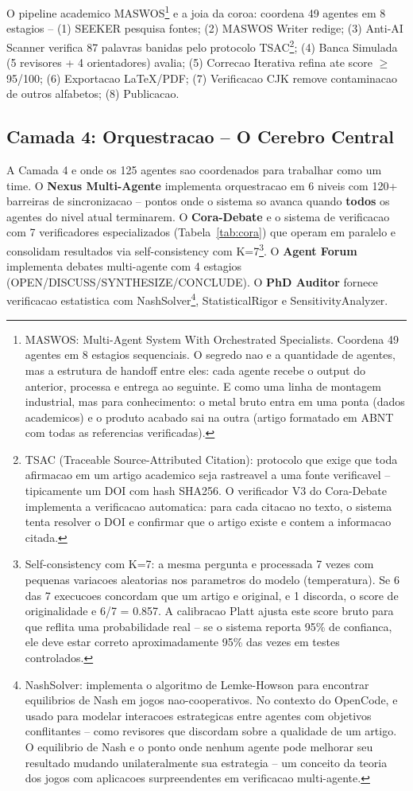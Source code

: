\documentclass[12pt,a4paper,oneside,sumario=tradicional,chapter=TITLE,section=TITLE,subsection=TITLE,english,brazil]{abntex2}
\begin{document}
O pipeline academico MASWOS\footnote{MASWOS: Multi-Agent System With Orchestrated Specialists. Coordena 49 agentes em 8 estagios sequenciais. O segredo nao e a quantidade de agentes, mas a estrutura de handoff entre eles: cada agente recebe o output do anterior, processa e entrega ao seguinte. E como uma linha de montagem industrial, mas para conhecimento: o metal bruto entra em uma ponta (dados academicos) e o produto acabado sai na outra (artigo formatado em ABNT com todas as referencias verificadas).} e a joia da coroa: coordena 49 agentes em 8 estagios -- (1) SEEKER pesquisa fontes; (2) MASWOS Writer redige; (3) Anti-AI Scanner verifica 87 palavras banidas pelo protocolo TSAC\footnote{TSAC (Traceable Source-Attributed Citation): protocolo que exige que toda afirmacao em um artigo academico seja rastreavel a uma fonte verificavel -- tipicamente um DOI com hash SHA256. O verificador V3 do Cora-Debate implementa a verificacao automatica: para cada citacao no texto, o sistema tenta resolver o DOI e confirmar que o artigo existe e contem a informacao citada.}; (4) Banca Simulada (5 revisores + 4 orientadores) avalia; (5) Correcao Iterativa refina ate score $\geq$ 95/100; (6) Exportacao LaTeX/PDF; (7) Verificacao CJK remove contaminacao de outros alfabetos; (8) Publicacao.

\subsection{Camada 4: Orquestracao -- O Cerebro Central}

A Camada 4 e onde os 125 agentes sao coordenados para trabalhar como um time. O \textbf{Nexus Multi-Agente} implementa orquestracao em 6 niveis com 120+ barreiras de sincronizacao -- pontos onde o sistema so avanca quando \textbf{todos} os agentes do nivel atual terminarem. O \textbf{Cora-Debate} e o sistema de verificacao com 7 verificadores especializados (Tabela~\ref{tab:cora}) que operam em paralelo e consolidam resultados via self-consistency com K=7\footnote{Self-consistency com K=7: a mesma pergunta e processada 7 vezes com pequenas variacoes aleatorias nos parametros do modelo (temperatura). Se 6 das 7 execucoes concordam que um artigo e original, e 1 discorda, o score de originalidade e 6/7 = 0.857. A calibracao Platt ajusta este score bruto para que reflita uma probabilidade real -- se o sistema reporta 95\% de confianca, ele deve estar correto aproximadamente 95\% das vezes em testes controlados.}. O \textbf{Agent Forum} implementa debates multi-agente com 4 estagios (OPEN/DISCUSS/SYNTHESIZE/CONCLUDE). O \textbf{PhD Auditor} fornece verificacao estatistica com NashSolver\footnote{NashSolver: implementa o algoritmo de Lemke-Howson para encontrar equilibrios de Nash em jogos nao-cooperativos. No contexto do OpenCode, e usado para modelar interacoes estrategicas entre agentes com objetivos conflitantes -- como revisores que discordam sobre a qualidade de um artigo. O equilibrio de Nash e o ponto onde nenhum agente pode melhorar seu resultado mudando unilateralmente sua estrategia -- um conceito da teoria dos jogos com aplicacoes surpreendentes em verificacao multi-agente.}, StatisticalRigor e SensitivityAnalyzer.
\end{document}
